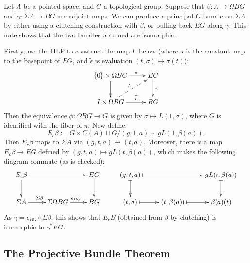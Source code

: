 \documentclass[11pt]{article}
\newcommand{\myheading}[1]
{{\noindent\Large #1}

}
\renewcommand{\myheading}[1]{\subsection{#1}}
\begin{document}
\begin{clutching v classifying}
Let $A$ be a pointed space, and $G$ a topological group. Suppose that $\beta:A\to \Omega BG$ and $\gamma:\Sigma A\to BG$ are adjoint maps. We can produce a principal $G$-bundle on $\Sigma A$ by either using a clutching construction with $\beta$, or pulling back $EG$ along $\gamma$. This note shows that the two bundles obtained are isomorphic.

Firstly, use the HLP to construct the map $L$ below (where $\star$ is the constant map to the basepoint of $EG$, and $\widetilde\epsilon$ is evaluation $(t,\sigma)\mapsto \sigma(t)$):
\[\xymatrix{
\{0\}\times\Omega BG\ar[r]^{\ \ \ \ \star}\ar[d]&EG\ar[d]^{\pi}\\
I\times\Omega BG\ar[r]^{\ \ \ \ \widetilde\epsilon}\ar@{-->}[ru]^L&BG
}\]
Then the equivalence $\phi:\Omega BG\to G$ is given by $\sigma\mapsto L(1,\sigma)$, where $G$ is identified with the fiber of $\pi$. Now define:
\[E_c\beta:=G\times C(A)\sqcup G / (g,1,a)\sim gL(1,\beta(a)).\]
Then $E_c\beta$ maps to $\Sigma A$ via $(g,t,a)\mapsto(t,a)$. Moreover, there is a map $E_c\beta\to EG$ defined by $(g,t,a)\mapsto gL(t,\beta(a))$, which makes the following diagram commute (as is checked): 
\[\xymatrix{
E_c\beta\ar[rr]\ar[d]&&EG\ar[d]&
(g,t,a)\ar@{|->}[rr]\ar@{|->}[d]&&gL(t,\beta(a))\ar@{|->}[d]\\
\Sigma A\ar[r]^{\Sigma\beta}&\Sigma\Omega BG\ar[r]^{\epsilon_{BG}}&BG&
(t,a)\ar@{|->}[r]&(t,\beta(a))\ar@{|->}[r]&\beta(a)(t)
}\]
As $\gamma=\epsilon_{BG}\circ\Sigma\beta$, this shows that $E_cB$ (obtained from $\beta$ by clutching) is isomorphic to $\gamma^*EG$.

\end{clutching v classifying}
\myheading{The Projective Bundle Theorem}
\end{document}
